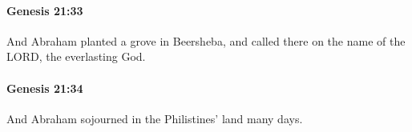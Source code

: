 		\paragraph{Genesis 21:33} %
			\label{GENESIS-21-33}

			And Abraham planted a grove in Beersheba, and called there on the name of the LORD, the everlasting God.


		\paragraph{Genesis 21:34} %
			\label{GENESIS-21-34}

			And Abraham sojourned in the Philistines' land many days.

